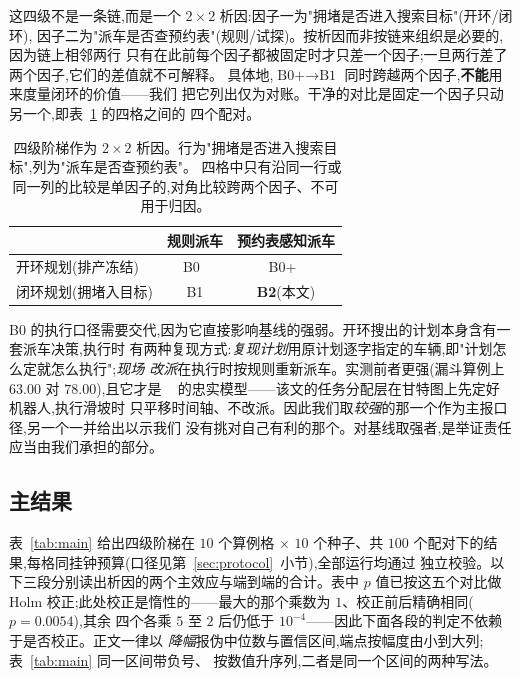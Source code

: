\documentclass[manuscript,screen,review]{acmart}
\newcommand{\NCases}{10}
\newcommand{\NSeeds}{10}
\newcommand{\NPairs}{100}
\newcommand{\PProbeLoop}{=0.0054}
\begin{document}
这四级不是一条链,而是一个 $2\times 2$ 析因:因子一为"拥堵是否进入搜索目标"(开环/闭环),
因子二为"派车是否查预约表"(规则/试探)。按析因而非按链来组织是必要的,因为链上相邻两行
只有在此前每个因子都被固定时才只差一个因子;一旦两行差了两个因子,它们的差值就不可解释。
具体地,$\text{B0+}\to\text{B1}$ 同时跨越两个因子,\textbf{不能}用来度量闭环的价值——我们
把它列出仅为对账。干净的对比是固定一个因子只动另一个,即表~\ref{tab:arms} 的四格之间的
四个配对。

\begin{table}[t]
\caption{四级阶梯作为 $2\times 2$ 析因。行为"拥堵是否进入搜索目标",列为"派车是否查预约表"。
四格中只有沿同一行或同一列的比较是单因子的,对角比较跨两个因子、不可用于归因。}
\label{tab:arms}
\footnotesize
\begin{tabular}{@{}lcc@{}}
\toprule
 & 规则派车 & 预约表感知派车 \\
\midrule
开环规划(排产冻结) & B0~\cite{li2026framework} & B0+~\cite{sun2023integrated} \\
闭环规划(拥堵入目标) & B1 & \textbf{B2}(本文) \\
\bottomrule
\end{tabular}
\end{table}

B0 的执行口径需要交代,因为它直接影响基线的强弱。开环搜出的计划本身含有一套派车决策,执行时
有两种复现方式:\emph{复现计划}用原计划逐字指定的车辆,即"计划怎么定就怎么执行";\emph{现场
改派}在执行时按规则重新派车。实测前者更强(漏斗算例上 $63.00$ 对 $78.00$),且它才是
~\cite{li2026framework} 的忠实模型——该文的任务分配层在甘特图上先定好机器人,执行滑坡时
只平移时间轴、不改派。因此我们取\emph{较强}的那一个作为主报口径,另一个一并给出以示我们
没有挑对自己有利的那个。对基线取强者,是举证责任应当由我们承担的部分。

\subsection{主结果}
\label{sec:main}

表~\ref{tab:main} 给出四级阶梯在 $\NCases$ 个算例格 $\times$ $\NSeeds$ 个种子、共
$\NPairs$ 个配对下的结果,每格同挂钟预算(口径见第~\ref{sec:protocol}~小节),全部运行均通过
独立校验。以下三段分别读出析因的两个主效应与端到端的合计。表中 $p$ 值已按这五个对比做
Holm 校正;此处校正是惰性的——最大的那个乘数为 $1$、校正前后精确相同($p\PProbeLoop$),其余
四个各乘 $5$ 至 $2$ 后仍低于 $10^{-4}$——因此下面各段的判定不依赖于是否校正。正文一律以
\emph{降幅}报伪中位数与置信区间,端点按幅度由小到大列;表~\ref{tab:main} 同一区间带负号、
按数值升序列,二者是同一个区间的两种写法。
\end{document}
